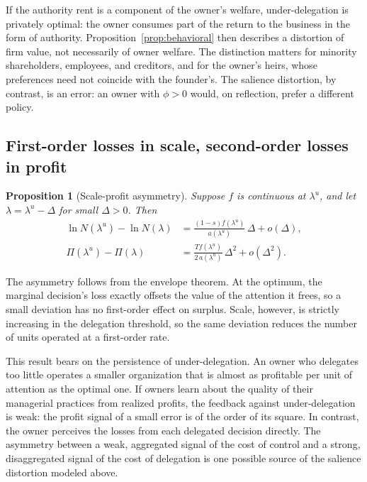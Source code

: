 \documentclass[11pt,a4paper]{article}
\theoremstyle{plain}
\newtheorem{proposition}{Proposition}
\begin{document}
If the authority rent is a component of the owner's welfare, under-delegation is privately optimal: the owner consumes part of the return to the business in the form of authority. Proposition~\ref{prop:behavioral} then describes a distortion of firm value, not necessarily of owner welfare. The distinction matters for minority shareholders, employees, and creditors, and for the owner's heirs, whose preferences need not coincide with the founder's. The salience distortion, by contrast, is an error: an owner with $\phi > 0$ would, on reflection, prefer a different policy.

\subsection{First-order losses in scale, second-order losses in profit}

\begin{proposition}[Scale-profit asymmetry]\label{prop:asymmetry}
Suppose $f$ is continuous at $\lambda^u$, and let $\lambda = \lambda^u - \Delta$ for small $\Delta > 0$. Then
\begin{align}
  \ln N(\lambda^u) - \ln N(\lambda) &= \frac{(1 - s) f(\lambda^u)}{a(\lambda^u)} \, \Delta + o(\Delta), \label{eq:scaleloss}\\
  \Pi(\lambda^u) - \Pi(\lambda) &= \frac{T f(\lambda^u)}{2 \, a(\lambda^u)} \, \Delta^2 + o(\Delta^2). \label{eq:profitloss}
\end{align}
\end{proposition}

The asymmetry follows from the envelope theorem. At the optimum, the marginal decision's loss exactly offsets the value of the attention it frees, so a small deviation has no first-order effect on surplus. Scale, however, is strictly increasing in the delegation threshold, so the same deviation reduces the number of units operated at a first-order rate.

This result bears on the persistence of under-delegation. An owner who delegates too little operates a smaller organization that is almost as profitable per unit of attention as the optimal one. If owners learn about the quality of their managerial practices from realized profits, the feedback against under-delegation is weak: the profit signal of a small error is of the order of its square. In contrast, the owner perceives the losses from each delegated decision directly. The asymmetry between a weak, aggregated signal of the cost of control and a strong, disaggregated signal of the cost of delegation is one possible source of the salience distortion modeled above.
\end{document}
